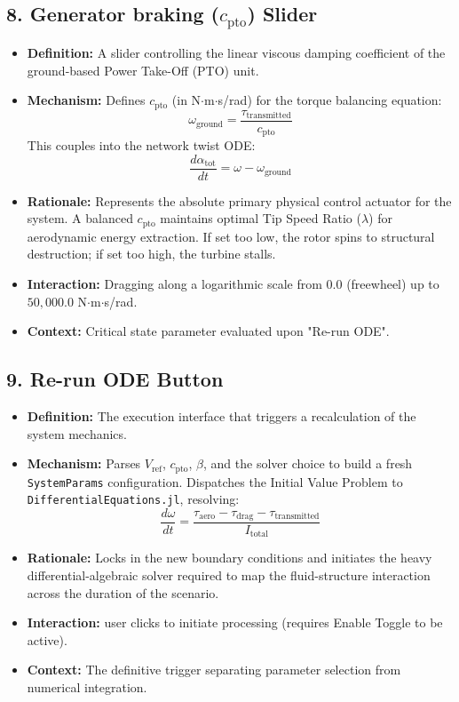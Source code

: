 \documentclass[11pt,a4paper]{article}
\begin{document}
\subsection{8. Generator braking ($c_{\text{pto}}$) Slider}
\begin{itemize}
    \item \textbf{Definition:} A slider controlling the linear viscous damping coefficient of the ground-based Power Take-Off (PTO) unit.
    \item \textbf{Mechanism:} Defines $c_{\text{pto}}$ (in N$\cdot$m$\cdot$s/rad) for the torque balancing equation:
    \begin{equation}
        \omega_{\text{ground}} = \frac{\tau_{\text{transmitted}}}{c_{\text{pto}}}
    \end{equation}
    This couples into the network twist ODE:
    \begin{equation}
        \frac{d\alpha_{\text{tot}}}{dt} = \omega - \omega_{\text{ground}}
    \end{equation}
    \item \textbf{Rationale:} Represents the absolute primary physical control actuator for the system. A balanced $c_{\text{pto}}$ maintains optimal Tip Speed Ratio ($\lambda$) for aerodynamic energy extraction. If set too low, the rotor spins to structural destruction; if set too high, the turbine stalls.
    \item \textbf{Interaction:} Dragging along a logarithmic scale from $0.0$ (freewheel) up to $50,000.0$ N$\cdot$m$\cdot$s/rad.
    \item \textbf{Context:} Critical state parameter evaluated upon "Re-run ODE".
\end{itemize}

\subsection{9. Re-run ODE Button}
\begin{itemize}
    \item \textbf{Definition:} The execution interface that triggers a recalculation of the system mechanics.
    \item \textbf{Mechanism:} Parses $V_{\text{ref}}$, $c_{\text{pto}}$, $\beta$, and the solver choice to build a fresh \texttt{SystemParams} configuration. Dispatches the Initial Value Problem to \texttt{DifferentialEquations.jl}, resolving:
    \begin{equation}
        \frac{d\omega}{dt} = \frac{\tau_{\text{aero}} - \tau_{\text{drag}} - \tau_{\text{transmitted}}}{I_{\text{total}}}
    \end{equation}
    \item \textbf{Rationale:} Locks in the new boundary conditions and initiates the heavy differential-algebraic solver required to map the fluid-structure interaction across the duration of the scenario.
    \item \textbf{Interaction:} user clicks to initiate processing (requires Enable Toggle to be active).
    \item \textbf{Context:} The definitive trigger separating parameter selection from numerical integration.
\end{itemize}
\end{document}
